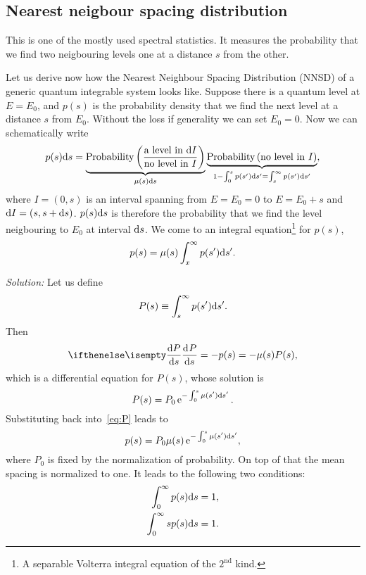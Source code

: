 \documentclass[a4paper,11pt,twoside]{article}
\begin{document}
    \subsection{Nearest neigbour spacing distribution}
        This is one of the mostly used spectral statistics.
        It measures the probability that we find two neigbouring levels one at a distance $s$ from the other.

        Let us derive now how the Nearest Neighbour Spacing Distribution (NNSD) of a generic quantum integrable system looks like.
        Suppose there is a quantum level at $E=E_{0}$, and $p(s)$ is the probability density that we find the next level at a distance $s$ from $E_{0}$.  
        Without the loss if generality we can set $E_{0}=0$.
        Now we can schematically write 
        \begin{equation}
            p(s)\mathrm{d} s
                =\underbrace{\text{Probability}\left(\frac{\text{a level in }\mathrm{d} I}{\text{no level in }I}\right)}_{\mu(s)\mathrm{d} s}
                \underbrace{\text{Probability}\left(\text{no level in }I\right)}_{1-\int_{0}^{s}p(s')\mathrm{d} s'=\int_{s}^{\infty}p(s')\mathrm{d} s'},
        \end{equation}
        where $I=(0,s)$ is an interval spanning from $E=E_{0}=0$ to $E=E_{0}+s$ and $\mathrm{d} I=(s,s+\mathrm{d} s)$.
        $p(s)\mathrm{d} s$ is therefore the probability that we find the level neigbouring to $E_{0}$ at interval $\mathrm{d} s$.
        We come to an integral equation\footnote{A separable Volterra integral equation of the $2^{\text{nd}}$ kind.} for $p(s)$,
        \begin{equation}
            p(s)=\mu(s)\int_{x}^{\infty}p(s')\mathrm{d} s'.
        \end{equation}
        
        \emph{Solution:} Let us define
        \begin{equation}
            P(s)\equiv\int_{s}^{\infty}p(s')\mathrm{d} s'.
        \end{equation}
        Then
        \begin{equation}\label{eq:P}
            \derivative{P}{s}=-p(s)=-\mu(s)P(s),
        \end{equation}
        which is a differential equation for $P(s)$, whose solution is
        \begin{equation}
            P(s)=P_{0}\operatorname{e}^{-\int_{0}^{s}\mu(s')\mathrm{d} s'}.
        \end{equation}
        Substituting back into~\eqref{eq:P} leads to
        \begin{equation}\label{eq:pseq}
            p(s)=P_{0}\mu(s)\operatorname{e}^{-\int_{0}^{s}\mu(s')\mathrm{d} s'},
        \end{equation}
        where $P_{0}$ is fixed by the normalization of probability.
        On top of that the mean spacing is normalized to one.
        It leads to the following two conditions:
        \begin{align}
            \int_{0}^{\infty}p(s)\mathrm{d} s&=1,\nonumber\\
            \label{eq:psnorm}
            \int_{0}^{\infty}s p(s)\mathrm{d} s&=1.
        \end{align}
         
\end{document}
